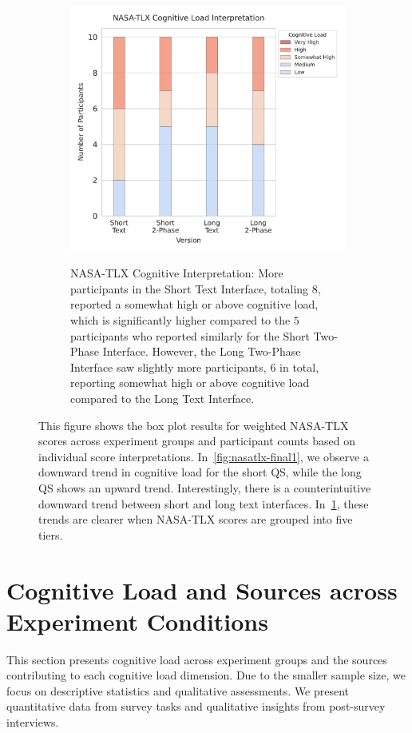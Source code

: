 \begin{figure}[htbp]
{\begin{subfigure}{0.49\textwidth}
{                \includegraphics[width=1.05\textwidth]{content/image/results/nasatlx_cog_value_interpreted.pdf}
            }
            \caption{NASA-TLX Cognitive Interpretation: More participants in the Short Text Interface, totaling $8$, reported a somewhat high or above cognitive load, which is significantly higher compared to the $5$ participants who reported similarly for the Short Two-Phase Interface. However, the Long Two-Phase Interface saw slightly more participants, $6$ in total, reporting somewhat high or above cognitive load compared to the Long Text Interface.}
            \label{fig:nasatlx-final2}
        \end{subfigure}
    }
    \caption{This figure shows the box plot results for weighted NASA-TLX scores across experiment groups and participant counts based on individual score interpretations. In~\ref{fig:nasatlx-final1}, we observe a downward trend in cognitive load for the short QS, while the long QS shows an upward trend. Interestingly, there is a counterintuitive downward trend between short and long text interfaces. In~\ref{fig:nasatlx-final2}, these trends are clearer when NASA-TLX scores are grouped into five tiers.}
    \label{fig:nasatlx-final}
\end{figure}


\section{Cognitive Load and Sources across Experiment Conditions}
\label{sec:cog_result}
This section presents cognitive load across experiment groups and the sources contributing to each cognitive load dimension. Due to the smaller sample size, we focus on descriptive statistics and qualitative assessments. We present quantitative data from survey tasks and qualitative insights from post-survey interviews.

